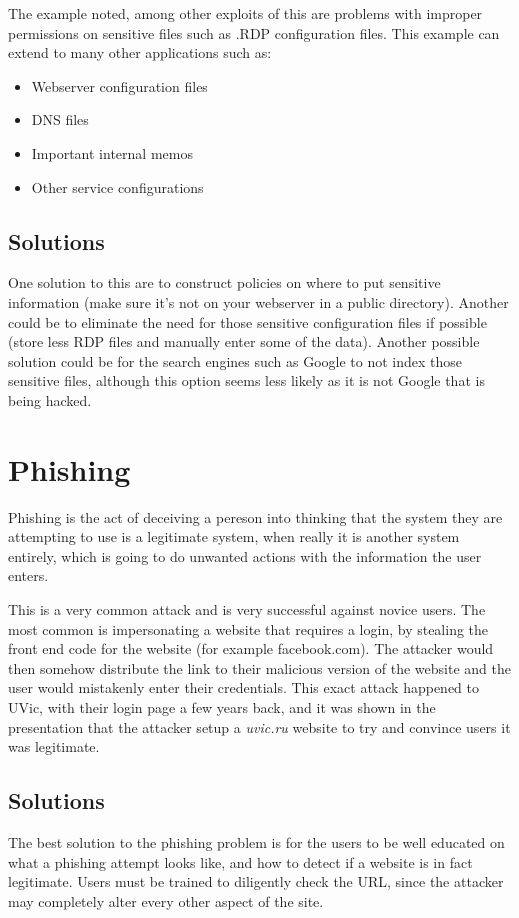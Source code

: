 \documentclass{article}
\numberwithin{equation}{section} %
\numberwithin{figure}{section} %
\numberwithin{table}{section} %
\begin{document}
The example noted, among other exploits of this are problems with improper permissions on sensitive files such as .RDP configuration files.  This example can extend to many other applications such as: 

\begin{itemize}
	\item Webserver configuration files
	\item DNS files
	\item Important internal memos
	\item Other service configurations
\end{itemize}

\subsection{Solutions}
One solution to this are to construct policies on where to put sensitive information (make sure it's not on your webserver in a public directory).  Another could be to eliminate the need for those sensitive configuration files if possible (store less RDP files and manually enter some of the data).  Another possible solution could be for the search engines such as Google to not index those sensitive files, although this option seems less likely as it is not Google that is being hacked. 

\section{Phishing}
Phishing is the act of deceiving a pereson into thinking that the system they are attempting to use is a legitimate system, when really it is another system entirely, which is going to do unwanted actions with the information the user enters.

This is a very common attack and is very successful against novice users.  The most common is impersonating a website that requires a login, by stealing the front end code for the website (for example facebook.com).  The attacker would then somehow distribute the link to their malicious version of the website and the user would mistakenly enter their credentials.  This exact attack happened to UVic, with their login page a few years back, and it was shown in the presentation that the attacker setup a \textit{uvic.ru} website to try and convince users it was legitimate. 
 
\subsection{Solutions}
The best solution to the phishing problem is for the users to be well educated on what a phishing attempt looks like, and how to detect if a website is in fact legitimate.  Users must be trained to diligently check the URL, since the attacker may completely alter every other aspect of the site.
\end{document}
